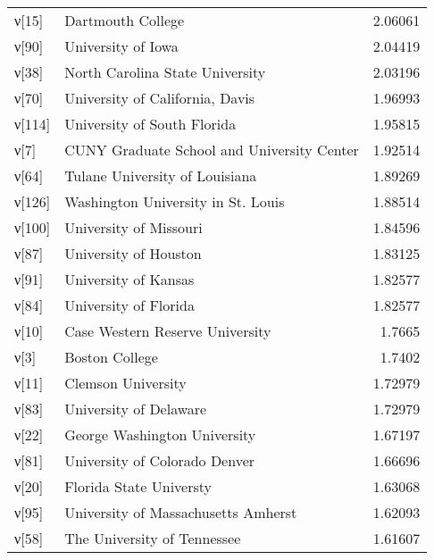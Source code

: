 \begin{tabular}{llr}
 ν[15]  & Dartmouth College                                              &  2.06061  \\
 ν[90]  & University of Iowa                                             &  2.04419  \\
 ν[38]  & North Carolina State University                                &  2.03196  \\
 ν[70]  & University of California, Davis                                &  1.96993  \\
 ν[114] & University of South Florida                                    &  1.95815  \\
 ν[7]   & CUNY Graduate School and University Center                     &  1.92514  \\
 ν[64]  & Tulane University of Louisiana                                 &  1.89269  \\
 ν[126] & Washington University in St. Louis                             &  1.88514  \\
 ν[100] & University of Missouri                                         &  1.84596  \\
 ν[87]  & University of Houston                                          &  1.83125  \\
 ν[91]  & University of Kansas                                           &  1.82577  \\
 ν[84]  & University of Florida                                          &  1.82577  \\
 ν[10]  & Case Western Reserve University                                &  1.7665   \\
 ν[3]   & Boston College                                                 &  1.7402   \\
 ν[11]  & Clemson University                                             &  1.72979  \\
 ν[83]  & University of Delaware                                         &  1.72979  \\
 ν[22]  & George Washington University                                   &  1.67197  \\
 ν[81]  & University of Colorado Denver                                  &  1.66696  \\
 ν[20]  & Florida State Universty                                        &  1.63068  \\
 ν[95]  & University of Massachusetts Amherst                            &  1.62093  \\
 ν[58]  & The University of Tennessee                                    &  1.61607  \\

\end{tabular}
